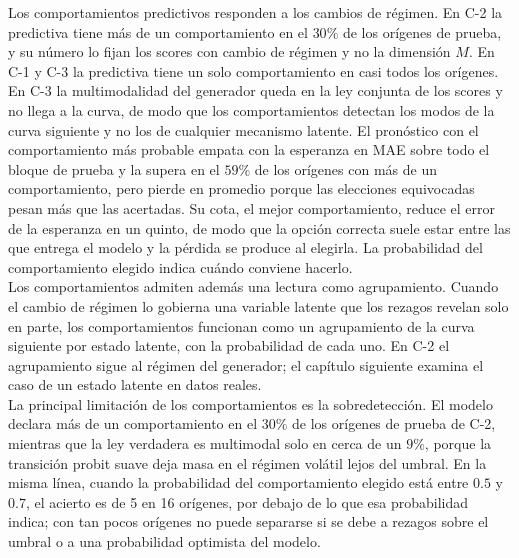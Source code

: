 Los comportamientos predictivos responden a los cambios de régimen. En C-2 la predictiva tiene más de un comportamiento en el $30\%$ de los orígenes de prueba, y su número lo fijan los scores con cambio de régimen y no la dimensión $M$. En C-1 y C-3 la predictiva tiene un solo comportamiento en casi todos los orígenes. En C-3 la multimodalidad del generador queda en la ley conjunta de los scores y no llega a la curva, de modo que los comportamientos detectan los modos de la curva siguiente y no los de cualquier mecanismo latente. El pronóstico con el comportamiento más probable empata con la esperanza en MAE sobre todo el bloque de prueba y la supera en el $59\%$ de los orígenes con más de un comportamiento, pero pierde en promedio porque las elecciones equivocadas pesan más que las acertadas. Su cota, el mejor comportamiento, reduce el error de la esperanza en un quinto, de modo que la opción correcta suele estar entre las que entrega el modelo y la pérdida se produce al elegirla. La probabilidad del comportamiento elegido indica cuándo conviene hacerlo.\\

Los comportamientos admiten además una lectura como agrupamiento. Cuando el cambio de régimen lo gobierna una variable latente que los rezagos revelan solo en parte, los comportamientos funcionan como un agrupamiento de la curva siguiente por estado latente, con la probabilidad de cada uno. En C-2 el agrupamiento sigue al régimen del generador; el capítulo siguiente examina el caso de un estado latente en datos reales.\\

La principal limitación de los comportamientos es la sobredetección. El modelo declara más de un comportamiento en el $30\%$ de los orígenes de prueba de C-2, mientras que la ley verdadera es multimodal solo en cerca de un $9\%$, porque la transición probit suave deja masa en el régimen volátil lejos del umbral. En la misma línea, cuando la probabilidad del comportamiento elegido está entre $0.5$ y $0.7$, el acierto es de 5 en 16 orígenes, por debajo de lo que esa probabilidad indica; con tan pocos orígenes no puede separarse si se debe a rezagos sobre el umbral o a una probabilidad optimista del modelo.\\


